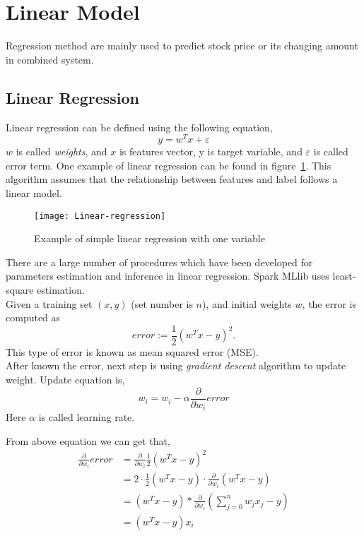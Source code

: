 \section{Linear Model}
Regression method are mainly used to predict stock price or its changing amount in combined system.

\subsection{Linear Regression}
Linear regression can be defined using the following equation,
\begin{equation}
	y=w^Tx + \varepsilon
\end{equation}
$ w $ is called \emph{weights}, and $ x $ is features vector, y is target variable, and $ \varepsilon $ is called error term. One example of linear regression can be found in figure~\ref{fg:linear_regression}. This algorithm assumes that the relationship between features and label follows a linear model.
\begin{figure}[h]
	\centering
	\texttt{[image: Linear-regression]}
	\caption{Example of simple linear regression with one variable}
	\label{fg:linear_regression}
\end{figure}


There are a large number of procedures which have been developed for parameters estimation and inference in linear regression. Spark MLlib uses least-square estimation\cite{7_mllib_linear_methods}.\\


Given a training set $ (x, y) $ (set number is $ n $), and initial weights $ w $, the error is computed as
\begin{equation}
error := \frac{1}{2} (w^T x - y)^2.
\label{eq:error_equation}
\end{equation}
This type of error is known as mean squared error (MSE).\\


After known the error, next step is using \emph{gradient descent} algorithm to update weight. Update equation is,
\begin{equation}
w_i=w_i-\alpha \frac{\partial}{\partial w_i} error
\label{eq:update_equation}
\end{equation}
Here $ \alpha $ is called learning rate. 


From above equation we can get that,
\begin{equation}
\begin{split}
\frac{\partial }{\partial w_i} error & = \frac{\partial }{\partial w_i} \frac{1}{2}(w^Tx-y)^2\\
& = 2 \cdot \frac{1}{2} (w^Tx-y) \cdot \frac{\partial }{\partial w_i} (w^Tx-y)\\
& = (w^Tx-y) * \frac{\partial }{\partial w_i} (\sum_{j=0}^{n}w_j x_j - y)\\
& = (w^Tx-y)x_i
\end{split}
\label{eq:partil_error}
\end{equation}



